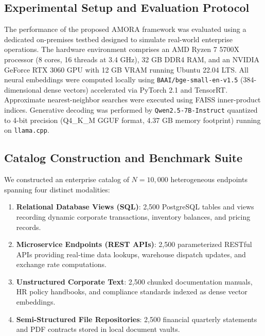 \documentclass[fleqn,10pt]{article}
\begin{document}
\subsection{Experimental Setup and Evaluation Protocol}
The performance of the proposed AMORA framework was evaluated using a dedicated on-premises testbed designed to simulate real-world enterprise operations. The hardware environment comprises an AMD Ryzen 7 5700X processor (8 cores, 16 threads at 3.4 GHz), 32 GB DDR4 RAM, and an NVIDIA GeForce RTX 3060 GPU with 12 GB VRAM running Ubuntu 22.04 LTS. All neural embeddings were computed locally using \texttt{BAAI/bge-small-en-v1.5} (384-dimensional dense vectors) accelerated via PyTorch 2.1 and TensorRT. Approximate nearest-neighbor searches were executed using FAISS inner-product indices. Generative decoding was performed by \texttt{Qwen2.5-7B-Instruct} quantized to 4-bit precision (Q4\_K\_M GGUF format, 4.37 GB memory footprint) running on \texttt{llama.cpp}.

\subsection{Catalog Construction and Benchmark Suite}
We constructed an enterprise catalog of $N = 10{,}000$ heterogeneous endpoints spanning four distinct modalities:
\begin{enumerate}[leftmargin=1.5em,noitemsep]
    \item \textbf{Relational Database Views (SQL)}: 2,500 PostgreSQL tables and views recording dynamic corporate transactions, inventory balances, and pricing records.
    \item \textbf{Microservice Endpoints (REST APIs)}: 2,500 parameterized RESTful APIs providing real-time data lookups, warehouse dispatch updates, and exchange rate computations.
    \item \textbf{Unstructured Corporate Text}: 2,500 chunked documentation manuals, HR policy handbooks, and compliance standards indexed as dense vector embeddings.
    \item \textbf{Semi-Structured File Repositories}: 2,500 financial quarterly statements and PDF contracts stored in local document vaults.
\end{enumerate}
\end{document}
